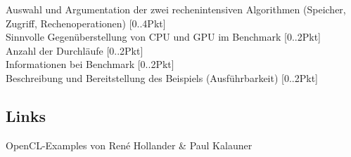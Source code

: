 \documentclass[letterpaper, 12pt]{article}
\let\tempsubsection\subsection
\renewcommand\subsection[1]{\vspace{0cm}\tempsubsection{#1}\vspace{0cm}}
\begin{document}
Auswahl und Argumentation der zwei rechenintensiven Algorithmen (Speicher, Zugriff, Rechenoperationen) [0..4Pkt] \\
Sinnvolle Gegenüberstellung von CPU und GPU im Benchmark [0..2Pkt] \\
Anzahl der Durchläufe [0..2Pkt] \\
Informationen bei Benchmark [0..2Pkt] \\
Beschreibung und Bereitstellung des Beispiels (Ausführbarkeit) [0..2Pkt] \\

\subsection{Links}
OpenCL-Examples von René Hollander \& Paul Kalauner \cite{opencl_example}

\clearpage
\end{document}
